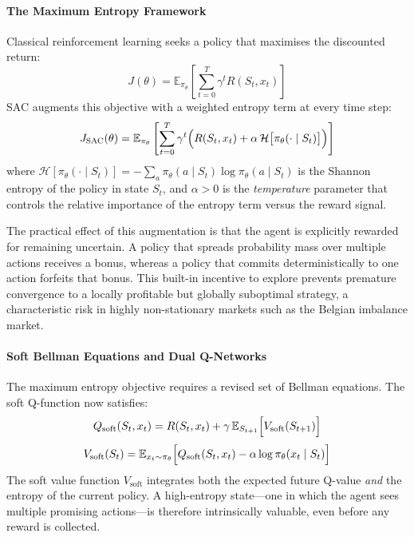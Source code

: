             \paragraph{The Maximum Entropy Framework}
            Classical reinforcement learning seeks a policy that maximises the discounted return:
            \[
                J(\theta) = \mathbb{E}_{\pi_\theta} \left[ \sum_{t=0}^{T} \gamma^t R(S_t, x_t) \right]
            \]
            SAC augments this objective with a weighted entropy term at every time step:
            \[
                J_{\text{SAC}}(\theta) = \mathbb{E}_{\pi_\theta} \left[ \sum_{t=0}^{T} \gamma^t \Bigl( R(S_t, x_t) + \alpha \,\mathcal{H}\bigl[\pi_\theta(\cdot \mid S_t)\bigr] \Bigr) \right]
            \]
            where $\mathcal{H}[\pi_\theta(\cdot \mid S_t)] = -\sum_a \pi_\theta(a \mid S_t)\log \pi_\theta(a \mid S_t)$ is the Shannon entropy of the policy in state $S_t$, and $\alpha > 0$ is the \textit{temperature} parameter that controls the relative importance of the entropy term versus the reward signal.

            The practical effect of this augmentation is that the agent is explicitly rewarded for remaining uncertain. A policy that spreads probability mass over multiple actions receives a bonus, whereas a policy that commits deterministically to one action forfeits that bonus. This built-in incentive to explore prevents premature convergence to a locally profitable but globally suboptimal strategy, a characteristic risk in highly non-stationary markets such as the Belgian imbalance market.

            \paragraph{Soft Bellman Equations and Dual Q-Networks}
            The maximum entropy objective requires a revised set of Bellman equations. The soft Q-function now satisfies:
            \[
                Q_{\text{soft}}(S_t, x_t) = R(S_t, x_t) + \gamma\, \mathbb{E}_{S_{t+1}} \Bigl[ V_{\text{soft}}(S_{t+1}) \Bigr]
            \]
            \[
                V_{\text{soft}}(S_t) = \mathbb{E}_{x_t \sim \pi_\theta} \Bigl[ Q_{\text{soft}}(S_t, x_t) - \alpha \log \pi_\theta(x_t \mid S_t) \Bigr]
            \]
            The soft value function $V_{\text{soft}}$ integrates both the expected future Q-value \textit{and} the entropy of the current policy. A high-entropy state---one in which the agent sees multiple promising actions---is therefore intrinsically valuable, even before any reward is collected.

